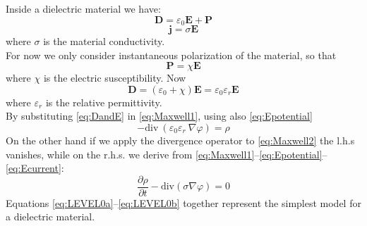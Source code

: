 \documentclass[11pt,a4paper]{article}
\begin{document}
Inside a dielectric material we have:
\begin{equation}
	\mathbf{D} = \varepsilon_{0} \mathbf{E} + \mathbf{P}
	\label{eq:D_composition}
\end{equation}
\begin{equation}
	\mathbf{j} = \sigma \mathbf{E}
	\label{eq:Ecurrent}
\end{equation}
where \(\sigma\) is the material conductivity.\\
For now we only consider instantaneous polarization of the material, so that 
\begin{equation}
	\mathbf{P} = \chi \mathbf{E}
\end{equation}
where \(\chi\) is the electric susceptibility. Now
\begin{equation}
	\mathbf{D} = \left( \varepsilon_0+\chi\right)\mathbf{E} = \varepsilon_0\varepsilon_r\mathbf{E}
	\label{eq:DandE}
\end{equation}
where \(\varepsilon_r\) is the relative permittivity.\\
By substituting \eqref{eq:DandE} in \eqref{eq:Maxwell1}, using also \eqref{eq:Epotential}
\begin{equation}\label{eq:LEVEL0a}
	- \mathrm{div}\ \left( \varepsilon_{0} \varepsilon_{r}\ \nabla \varphi
	\right)  = \rho
\end{equation}
On the other hand if we apply the divergence operator to \eqref{eq:Maxwell2} the l.h.s vanishes, while on the r.h.s. we derive from \eqref{eq:Maxwell1}--\eqref{eq:Epotential}--\eqref{eq:Ecurrent}:
\begin{equation}\label{eq:LEVEL0b}
	\dfrac{\partial \rho}{\partial t} - \mathrm{div} \left(  \sigma \nabla \varphi\right) = 0
\end{equation}
Equations \eqref{eq:LEVEL0a}--\eqref{eq:LEVEL0b} together represent the simplest model for a dielectric material.
\end{document}
